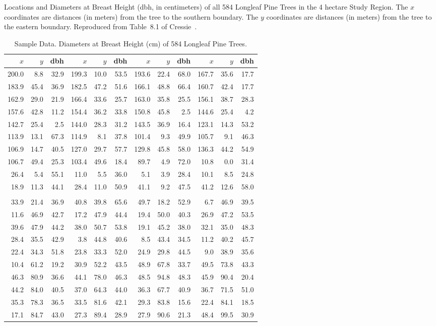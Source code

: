 \documentclass[draft]{article}
\begin{document}
\clearpage

\begin{table}
\caption{Sample Data. Diameters at Breast Height (cm)
of 584 Longleaf Pine Trees.}
\label{tbl:pine}
Locations and Diameters at Breast Height (dbh, in centimeters)
of all 584 Longleaf Pine Trees in the 4 hectare Study Region.
The \(x\) coordinates are distances (in meters) from the tree to the 
southern boundary. The \(y\) coordinates are distances (in meters) from
the tree to the eastern boundary.
Reproduced from Table~8.1 of Cressie~\protect\cite{cressie91}.
\scriptsize
\begin{center}
\begin{tabular}{rrrrrrrrrrrr}
\hline
\(x\)&\(y\)& dbh &\(x\)&\(y\)& dbh &\(x\)&\(y\)& dbh &\(x\)&\(y\)& dbh \\
\hline
200.0&  8.8& 32.9&199.3& 10.0& 53.5&193.6& 22.4& 68.0&167.7& 35.6& 17.7\\
183.9& 45.4& 36.9&182.5& 47.2& 51.6&166.1& 48.8& 66.4&160.7& 42.4& 17.7\\
162.9& 29.0& 21.9&166.4& 33.6& 25.7&163.0& 35.8& 25.5&156.1& 38.7& 28.3\\
157.6& 42.8& 11.2&154.4& 36.2& 33.8&150.8& 45.8&  2.5&144.6& 25.4&  4.2\\
142.7& 25.4&  2.5&144.0& 28.3& 31.2&143.5& 36.9& 16.4&123.1& 14.3& 53.2\\
113.9& 13.1& 67.3&114.9&  8.1& 37.8&101.4&  9.3& 49.9&105.7&  9.1& 46.3\\
106.9& 14.7& 40.5&127.0& 29.7& 57.7&129.8& 45.8& 58.0&136.3& 44.2& 54.9\\
106.7& 49.4& 25.3&103.4& 49.6& 18.4& 89.7&  4.9& 72.0& 10.8&  0.0& 31.4\\
 26.4&  5.4& 55.1& 11.0&  5.5& 36.0&  5.1&  3.9& 28.4& 10.1&  8.5& 24.8\\
 18.9& 11.3& 44.1& 28.4& 11.0& 50.9& 41.1&  9.2& 47.5& 41.2& 12.6& 58.0\\
\\
 33.9& 21.4& 36.9& 40.8& 39.8& 65.6& 49.7& 18.2& 52.9&  6.7& 46.9& 39.5\\
 11.6& 46.9& 42.7& 17.2& 47.9& 44.4& 19.4& 50.0& 40.3& 26.9& 47.2& 53.5\\
 39.6& 47.9& 44.2& 38.0& 50.7& 53.8& 19.1& 45.2& 38.0& 32.1& 35.0& 48.3\\
 28.4& 35.5& 42.9&  3.8& 44.8& 40.6&  8.5& 43.4& 34.5& 11.2& 40.2& 45.7\\
 22.4& 34.3& 51.8& 23.8& 33.3& 52.0& 24.9& 29.8& 44.5&  9.0& 38.9& 35.6\\
 10.4& 61.2& 19.2& 30.9& 52.2& 43.5& 48.9& 67.8& 33.7& 49.5& 73.8& 43.3\\
 46.3& 80.9& 36.6& 44.1& 78.0& 46.3& 48.5& 94.8& 48.3& 45.9& 90.4& 20.4\\
 44.2& 84.0& 40.5& 37.0& 64.3& 44.0& 36.3& 67.7& 40.9& 36.7& 71.5& 51.0\\
 35.3& 78.3& 36.5& 33.5& 81.6& 42.1& 29.3& 83.8& 15.6& 22.4& 84.1& 18.5\\
 17.1& 84.7& 43.0& 27.3& 89.4& 28.9& 27.9& 90.6& 21.3& 48.4& 99.5& 30.9\\


\end{tabular}
\end{center}
\end{table}
\end{document}
